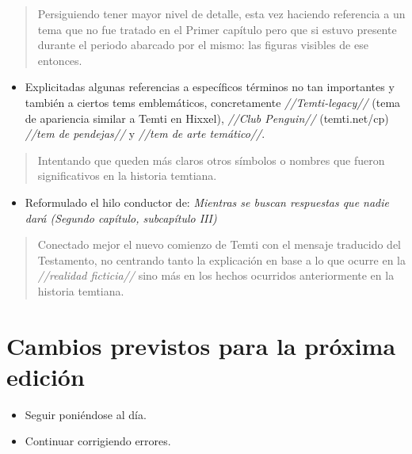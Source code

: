 \documentclass[
  spanish,
]{book}
\providecommand{\tightlist}{%
  \setlength{\itemsep}{0pt}\setlength{\parskip}{0pt}}
\begin{document}
\begin{quote}
Persiguiendo tener mayor nivel de detalle, esta vez haciendo referencia a un tema que no fue tratado en el Primer capítulo pero que si estuvo presente durante el periodo abarcado por el mismo: las figuras visibles de ese entonces.
\end{quote}

\begin{itemize}
\tightlist
\item
  Explicitadas algunas referencias a específicos términos no tan importantes y también a ciertos tems emblemáticos, concretamente \emph{//Temti-legacy//} (tema de apariencia similar a Temti en Hixxel), \emph{//Club Penguin//} (temti.net/cp) \emph{//tem de pendejas//} y \emph{//tem de arte temático//}.
\end{itemize}

\begin{quote}
Intentando que queden más claros otros símbolos o nombres que fueron significativos en la historia temtiana.
\end{quote}

\begin{itemize}
\tightlist
\item
  Reformulado el hilo conductor de: \emph{Mientras se buscan respuestas que nadie dará (Segundo capítulo, subcapítulo III)}
\end{itemize}

\begin{quote}
Conectado mejor el nuevo comienzo de Temti con el mensaje traducido del Testamento, no centrando tanto la explicación en base a lo que ocurre en la \emph{//realidad ficticia//} sino más en los hechos ocurridos anteriormente en la historia temtiana.
\end{quote}

\hypertarget{cambios-previstos-para-la-pruxf3xima-ediciuxf3n}{%
\section*{Cambios previstos para la próxima edición}\label{cambios-previstos-para-la-pruxf3xima-ediciuxf3n}}

\begin{itemize}
\item
  Seguir poniéndose al día.
\item
  Continuar corrigiendo errores.
\end{itemize}
\end{document}
